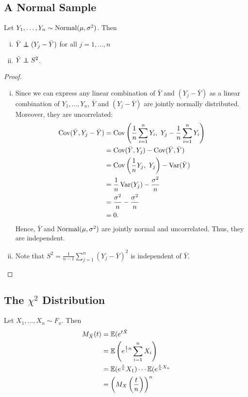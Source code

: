 
\subsection{A Normal Sample}
\begin{prop}Let $Y_1,\dots,Y_n\sim \operatorname*{Normal}(\mu,
\sigma^2)$. Then
\begin{enumerate}[(i)]
    \item $\bar Y\ind (Y_j-\bar Y)$ for all $j=1,\dots,n$
    \item $\bar Y\ind S^2$.
\end{enumerate}
\end{prop}
\begin{proof}
\phantom{x}
	\begin{enumerate}[(i)]
			\item Since we can express any linear combination of $\bar Y$ and $(Y_j-\bar Y)$ as a linear combination of $Y_1,\dots, Y_n$, $\bar{Y}$ and $(Y_j-\bar{Y})$ are jointly normally distributed. Moreover, they are uncorrelated:
    \begin{align*}
    \operatorname*{Cov}(\bar Y, Y_j-\bar Y)&=\operatorname*{Cov}\left(\frac{1}{n}\sum^n_{i=1}Y_i, \ Y_j-\frac{1}{n}\sum^n_{i=1}Y_i\right) \\
    &=\operatorname*{Cov}(\bar Y,Y_j)-\operatorname*{Cov}(\bar Y,\bar Y) \\
    &=\operatorname*{Cov}\left(\frac{1}{n}Y_j,\ Y_j\right)-\operatorname*{Var}(\bar{Y}) \\
    &=\frac{1}{n}\operatorname*{Var}(Y_j)-\frac{\sigma^2}{n}\\
	&=\frac{\sigma^2}{n}-\frac{\sigma^2}{n}\\
	&= 0.
    \end{align*}
    Hence, $\bar Y$ and $\operatorname*{Normal}(\mu,\sigma^2)$ are jointly normal and uncorrelated. Thus, they are independent.
    \item Note that $S^2=\frac{1}{n-1}\sum^n_{j=1}(Y_j-\bar Y)^2$ is independent of $\bar Y.$
\end{enumerate}
\end{proof}

\subsection{\texorpdfstring{The $\chi^2$ Distribution}{The Chi-Squared Distribution}}

\begin{recall}
Let $X_1,\dots,X_n\sim F_x$. Then 
\begin{align*}
M_{\bar X}(t)&=\mathbb E(e^{t\bar X}\\
&=\mathbb E\left(e^{\frac{t}[n}\sum^n_{i=1}X_i\right)\\
&=\mathbb E(e^{\frac{t}{n}}X_1) \cdots \mathbb E(e^{\frac{t}{n}X_n} \\
&=\left(M_X\left(\frac{t}{n}\right)\right)^n
\end{align*}
\end{recall}


